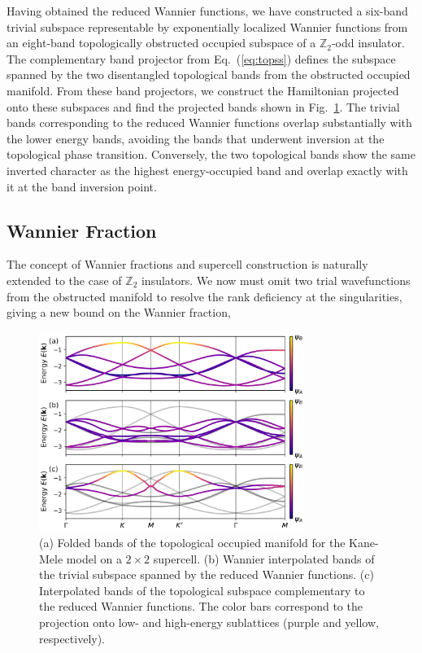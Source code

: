 \documentclass[galley,aps,pra,10pt,amsmath,amssymb,
    superscriptaddress,nofootinbib,longbibliography]{revtex4-2}
\newcounter{comm}
\newcommand{\eq}[1]{Eq.~(\ref{eq:#1})}
\begin{document}
Having obtained the reduced Wannier functions, we have constructed a six-band trivial subspace representable by exponentially localized Wannier functions from an eight-band topologically obstructed occupied subspace of a $\mathbb{Z}_2$-odd insulator. The complementary band projector from \eq{topss} defines the subspace spanned by the two disentangled topological bands from the obstructed occupied manifold. From these band projectors, we construct the Hamiltonian projected onto these subspaces and find the projected bands shown in Fig.~\ref{FIG13}. The trivial bands corresponding to the reduced Wannier functions overlap substantially with the lower energy bands, avoiding the bands that underwent inversion at the topological phase transition. Conversely, the two topological bands show the same inverted character as the highest energy-occupied band and overlap exactly with it at the band inversion point.


\subsection{Wannier Fraction}

The concept of Wannier fractions and supercell construction is naturally extended to the case of $\mathbb{Z}_2$ insulators. We now must omit two trial wavefunctions from the obstructed manifold to resolve the rank deficiency at the singularities, giving a new bound on the Wannier fraction,

\begin{figure}[t!]
\begin{center}
\includegraphics[width=3.4in]{fig13.png}
\end{center}
\vspace{-5mm}
\caption{(a) Folded bands of the topological occupied manifold for the Kane-Mele model on a $2\times 2$ supercell. (b) Wannier interpolated bands of the trivial subspace spanned by the reduced Wannier functions. (c) Interpolated bands of the topological subspace complementary to the reduced Wannier functions. The color bars correspond to the projection onto low- and high-energy sublattices (purple and yellow, respectively).}
\label{FIG13}
\end{figure}
  
\end{document}

